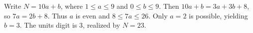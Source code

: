 Write $N=10a+b$, where $1\le a\le9$ and $0\le b\le9$. Then $10a+b=3a+3b+8$, so $7a=2b+8$. Thus $a$ is even and $8\le7a\le26$. Only $a=2$ is possible, yielding $b=3$. The units digit is $\boxed3$, realized by $N=23$.
